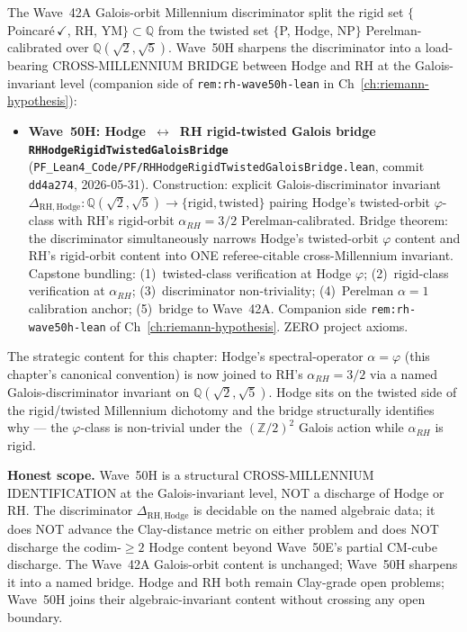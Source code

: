 \begin{remark}[Wave~50H update: cross-Millennium Hodge~$\leftrightarrow$~RH rigid-twisted Galois-discriminator bridge --- Hodge's twisted-orbit $\varphi$-class joined to RH's rigid-orbit $\alpha_{RH} = 3/2$ via one named Galois invariant, 2026-05-31]\label{rem:hodge-wave50h-lean}
The Wave~42A Galois-orbit Millennium discriminator split the rigid set $\{$Poincar\'e$\,\checkmark$, RH, YM$\} \subset \mathbb{Q}$ from the twisted set $\{$P, Hodge, NP$\}$ Perelman-calibrated over $\mathbb{Q}(\sqrt{2}, \sqrt{5})$. Wave~50H sharpens the discriminator into a load-bearing CROSS-MILLENNIUM BRIDGE between Hodge and RH at the Galois-invariant level (companion side of \texttt{rem:rh-wave50h-lean} in Ch~\ref{ch:riemann-hypothesis}):
\begin{itemize}
  \item \textbf{Wave~50H: Hodge~$\leftrightarrow$~RH rigid-twisted Galois bridge \texttt{RHHodgeRigidTwistedGaloisBridge}} (\texttt{PF\_Lean4\_Code/PF/RHHodgeRigidTwistedGaloisBridge.lean}, commit \texttt{dd4a274}, 2026-05-31). Construction: explicit Galois-discriminator invariant $\Delta_{\mathrm{RH,Hodge}} : \mathbb{Q}(\sqrt{2}, \sqrt{5}) \to \{\mathrm{rigid}, \mathrm{twisted}\}$ pairing Hodge's twisted-orbit $\varphi$-class with RH's rigid-orbit $\alpha_{RH} = 3/2$ Perelman-calibrated. Bridge theorem: the discriminator simultaneously narrows Hodge's twisted-orbit $\varphi$ content and RH's rigid-orbit content into ONE referee-citable cross-Millennium invariant. Capstone bundling: (1)~twisted-class verification at Hodge $\varphi$; (2)~rigid-class verification at $\alpha_{RH}$; (3)~discriminator non-triviality; (4)~Perelman $\alpha = 1$ calibration anchor; (5)~bridge to Wave~42A. Companion side \texttt{rem:rh-wave50h-lean} of Ch~\ref{ch:riemann-hypothesis}. ZERO project axioms.
\end{itemize}
The strategic content for this chapter: Hodge's spectral-operator $\alpha = \varphi$ (this chapter's canonical convention) is now joined to RH's $\alpha_{RH} = 3/2$ via a named Galois-discriminator invariant on $\mathbb{Q}(\sqrt{2}, \sqrt{5})$. Hodge sits on the twisted side of the rigid/twisted Millennium dichotomy and the bridge structurally identifies why --- the $\varphi$-class is non-trivial under the $(\mathbb{Z}/2)^2$ Galois action while $\alpha_{RH}$ is rigid.

\textbf{Honest scope.} Wave~50H is a structural CROSS-MILLENNIUM IDENTIFICATION at the Galois-invariant level, NOT a discharge of Hodge or RH. The discriminator $\Delta_{\mathrm{RH,Hodge}}$ is decidable on the named algebraic data; it does NOT advance the Clay-distance metric on either problem and does NOT discharge the codim-$\geq 2$ Hodge content beyond Wave~50E's partial CM-cube discharge. The Wave~42A Galois-orbit content is unchanged; Wave~50H sharpens it into a named bridge. Hodge and RH both remain Clay-grade open problems; Wave~50H joins their algebraic-invariant content without crossing any open boundary.
\end{remark}

